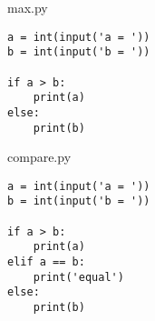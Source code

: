 \documentclass[aspectratio=1610,t]{beamer}
\begin{document}
\begin{pframe}
 \begin{minipage}[t]{0.47\textwidth}
 \begin{center}
  
 \end{center}
 \end{minipage}\qquad%
 \begin{minipage}[t]{0.47\textwidth}
 \begin{pythonfile}{max.py}
  \begin{verbatim}
a = int(input('a = '))
b = int(input('b = '))

if a > b:
    print(a)
else:
    print(b)
  \end{verbatim}
 \end{pythonfile}

 \begin{terminal}
 \end{terminal}
 \end{minipage}
\end{pframe}


\begin{pframe}
 \vspace{-0.5cm}
 \begin{minipage}[t]{0.57\textwidth}
  \begin{center}
   
  \end{center}
 \end{minipage}%
 \begin{minipage}[t]{0.37\textwidth}
  \begin{pythonfile}{compare.py}
   \begin{verbatim}
a = int(input('a = '))
b = int(input('b = '))

if a > b:
    print(a)
elif a == b:
    print('equal')
else:
    print(b)
   \end{verbatim}
  \end{pythonfile}
  \begin{terminal}
  \end{terminal}
 \end{minipage}
\end{pframe}
\end{document}
